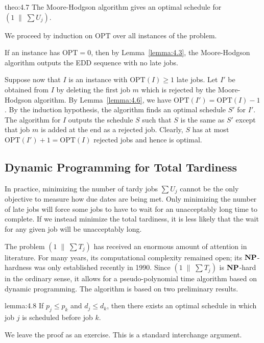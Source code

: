 \begin{theo}{theo:4.7}
    The Moore-Hodgson algorithm gives an optimal schedule for 
    $(1\;\|\;\sum U_j)$. 
\end{theo}
\begin{pf}
    We proceed by induction on $\text{OPT}$ over all instances of the problem. 

    If an instance has $\text{OPT} = 0$, then by Lemma~\ref{lemma:4.3}, the 
    Moore-Hodgson algorithm outputs the EDD sequence with no late jobs. 

    Suppose now that $I$ is an instance with $\text{OPT}(I) \geq 1$ late 
    jobs. Let $I'$ be obtained from $I$ by deleting the first job $m$ 
    which is rejected by the Moore-Hodgson algorithm. By Lemma~\ref{lemma:4.6}, 
    we have $\text{OPT}(I') = \text{OPT}(I) - 1$. By the induction hypothesis, 
    the algorithm finds an optimal schedule $S'$ for $I'$. The algorithm 
    for $I$ outputs the schedule $S$ such that $S$ is the same as $S'$ 
    except that job $m$ is added at the end as a rejected job. Clearly, 
    $S$ has at most $\text{OPT}(I') + 1 = \text{OPT}(I)$ rejected jobs 
    and hence is optimal. 
\end{pf}

\subsection{Dynamic Programming for Total Tardiness} \label{subsec:4.3}
In practice, minimizing the number of tardy jobs $\sum U_j$ cannot be the 
only objective to measure how due dates are being met. Only minimizing 
the number of late jobs will force some jobs to have to wait for an 
unacceptably long time to complete. If we instead minimize the total 
tardiness, it is less likely that the wait for any given job will be 
unacceptably long. 

The problem $(1\;\|\;\sum T_j)$ has received an enormous amount of attention 
in literature. For many years, its computational complexity remained open; 
its $\operatorname{\textbf{NP}}$-hardness was only established recently in 1990. Since 
$(1\;\|\;\sum T_j)$ is $\operatorname{\textbf{NP}}$-hard in the ordinary sense, it allows for a 
pseudo-polynomial time algorithm based on dynamic programming. The 
algorithm is based on two preliminary results. 

\begin{lemma}{lemma:4.8}
    If $p_j \leq p_k$ and $d_j \leq d_k$, then there exists an optimal schedule 
    in which job $j$ is scheduled before job $k$. 
\end{lemma}
\begin{pf}
    We leave the proof as an exercise. This is a standard interchange 
    argument. 
\end{pf}

